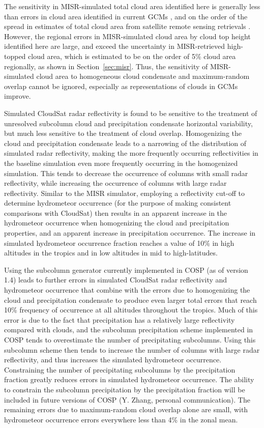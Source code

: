 The sensitivity in MISR-simulated total cloud area identified here is
generally less than errors in cloud area identified in current GCMs
\citep{kay_et_al_2012, klein_et_al_2013, bodas-salcedo_et_al_2011}, and
on the order of the spread in estimates of total cloud area from
satellite remote sensing retrievals \citeauthor{marchand_et_al_2010}
\citetext{\citeyear{marchand_et_al_2010}; \citealp{pincus_et_al_2012}}.
However, the regional errors in MISR-simulated cloud area by cloud top
height identified here are large, and exceed the uncertainty in
MISR-retrieved high-topped cloud area, which is estimated to be on the
order of 5\% cloud area regionally, as shown in Section~\ref{sec:misr}.
Thus, the sensitivity of MISR-simulated cloud area to homogeneous cloud
condensate and maximum-random overlap cannot be ignored, especially as
representations of clouds in GCMs improve.

Simulated CloudSat radar reflectivity is found to be sensitive to the
treatment of unresolved subcolumn cloud and precipitation condensate
horizontal variability, but much less sensitive to the treatment of
cloud overlap. Homogenizing the cloud and precipitation condensate leads
to a narrowing of the distribution of simulated radar reflectivity,
making the more frequently occurring reflectivities in the baseline
simulation even more frequently occurring in the homogenized simulation.
This tends to decrease the occurrence of columns with small radar
reflectivity, while increasing the occurrence of columns with large
radar reflectivity. Similar to the MISR simulator, employing a
reflectivity cut-off to determine hydrometeor occurrence (for the
purpose of making consistent comparisons with CloudSat) then results in
an apparent increase in the hydrometeor occurrence when homogenizing the
cloud and precipitation properties, and an apparent increase in
precipitation occurrence. The increase in simulated hydrometeor
occurrence fraction reaches a value of 10\% in high altitudes in the
tropics and in low altitudes in mid to high-latitudes.

Using the subcolumn generator currently implemented in COSP (as of
version 1.4) leads to further errors in simulated CloudSat radar
reflectivity and hydrometeor occurrence that combine with the errors due
to homogenizing the cloud and precipitation condensate to produce even
larger total errors that reach 10\% frequency of occurrence at all
altitudes throughout the tropics. Much of this error is due to the fact
that precipitation has a relatively large reflectivity compared with
clouds, and the subcolumn precipitation scheme implemented in COSP tends
to overestimate the number of precipitating subcolumns. Using this
subcolumn scheme then tends to increase the number of columns with large
radar reflectivity, and thus increases the simulated hydrometeor
occurrence. Constraining the number of precipitating subcolumns by the
precipitation fraction greatly reduces errors in simulated hydrometeor
occurrence. The ability to constrain the subcolumn precipitation by the
precipitation fraction will be included in future versions of COSP (Y.
Zhang, personal communication). The remaining errors due to
maximum-random cloud overlap alone are small, with hydrometeor
occurrence errors everywhere less than 4\% in the zonal mean.

